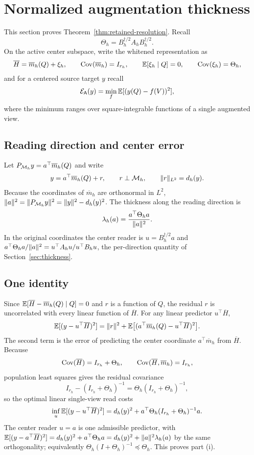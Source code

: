 \section{Normalized augmentation thickness}\label{app:resolution}

This section proves Theorem~\ref{thm:retained-resolution}. Recall
\[
\Theta_h
=
B_h^{\dagger/2}A_hB_h^{\dagger/2}.
\]
On the active center subspace, write the whitened representation as
\[
\overline H
=
\overline m_h(Q)+\xi_h,
\qquad
\operatorname{Cov}(\overline m_h)=I_{r_h},
\qquad
\mathbb{E}[\xi_h\mid Q]=0,
\qquad
\operatorname{Cov}(\xi_h)=\Theta_h,
\]
and for a centered source target $y$ recall
\[
\mathcal{E}_{\mathsf A}(y)
=
\min_f\mathbb{E}[(y(Q)-f(V))^2],
\]
where the minimum ranges over square-integrable functions of a single augmented view.

\subsection{Reading direction and center error}

Let $P_{\mathcal{M}_h}y=a^\top\overline m_h(Q)$ and write
\[
y=a^\top\overline m_h(Q)+r,
\qquad
r\perp\mathcal{M}_h,
\qquad
\lVert r\rVert_{L^2}=d_h(y).
\]
Because the coordinates of $\overline m_h$ are orthonormal in $L^2$,
$\lVert a\rVert^2=\lVert P_{\mathcal{M}_h}y\rVert^2=\lVert y\rVert^2-d_h(y)^2$. The thickness along the reading
direction is
\[
\lambda_h(a)=\frac{a^\top\Theta_ha}{\lVert a\rVert^2}.
\]
In the original coordinates the center reader is $u=B_h^{\dagger/2}a$ and
$a^\top\Theta_ha/\lVert a\rVert^2=u^\top A_hu/u^\top B_hu$, the per-direction quantity of
Section~\ref{sec:thickness}.

\subsection{One identity}

Since $\mathbb{E}[\overline H-\overline m_h(Q)\mid Q]=0$ and $r$ is a function of $Q$, the residual
$r$ is uncorrelated with every linear function of $\overline H$. For any linear predictor
$u^\top\overline H$,
\[
\mathbb{E}[(y-u^\top\overline H)^2]
=
\lVert r\rVert^2
+
\mathbb{E}\big[(a^\top\overline m_h(Q)-u^\top\overline H)^2\big].
\]
The second term is the error of predicting the center coordinate $a^\top\overline m_h$ from
$\overline H$. Because
\[
\operatorname{Cov}(\overline H)=I_{r_h}+\Theta_h,
\qquad
\operatorname{Cov}(\overline H,\overline m_h)=I_{r_h},
\]
population least squares gives the residual covariance
\[
I_{r_h}-(I_{r_h}+\Theta_h)^{-1}
=
\Theta_h(I_{r_h}+\Theta_h)^{-1},
\]
so the optimal linear single-view read costs
\[
\inf_u\mathbb{E}[(y-u^\top\overline H)^2]
=
d_h(y)^2+a^\top\Theta_h(I_{r_h}+\Theta_h)^{-1}a.
\]
The center reader $u=a$ is one admissible predictor, with
$\mathbb{E}[(y-a^\top\overline H)^2]=d_h(y)^2+a^\top\Theta_ha=d_h(y)^2+\lVert a\rVert^2\lambda_h(a)$
by the same orthogonality; equivalently $\Theta_h(I+\Theta_h)^{-1}\preceq\Theta_h$. This
proves part (i).

